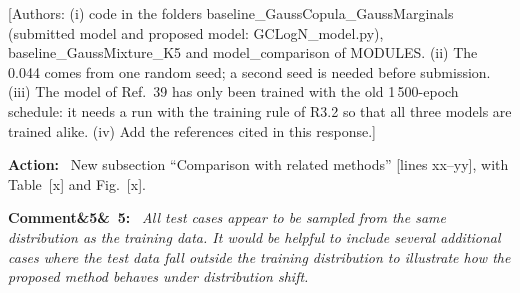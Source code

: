 \documentclass[11pt]{article}
\newenvironment{rcomment}[1]{\par\bigskip\noindent\textbf{Comment\ifx&#1&\else\ #1\fi:}\ \itshape}{\par}
\newenvironment{action}{\par\smallskip\noindent\color{resp}\textbf{Action:}\ }{\par}
\newcommand{\authornote}[1]{\textcolor{note}{\textsf{[Authors: #1]}}}
\newcommand{\tbd}[1]{\textcolor{note}{\textsf{[#1]}}}
\newcommand{\lines}[1]{\tbd{lines #1}}
\begin{document}
\authornote{(i) code in the folders baseline\_GaussCopula\_GaussMarginals (submitted model and proposed model:
GCLogN\_model.py), baseline\_GaussMixture\_K5 and model\_comparison of MODULES. (ii) The 0.044 comes from one random seed; a
second seed is needed before submission. (iii) The model of Ref.~39 has only been trained with the old 1\,500-epoch
schedule: it needs a run with the training rule of R3.2 so that all three models are trained alike. (iv) Add the
references cited in this response.}

\begin{action}
New subsection ``Comparison with related methods'' \lines{xx--yy}, with Table~\tbd{x} and Fig.~\tbd{x}.
\end{action}

\begin{rcomment}{5}
All test cases appear to be sampled from the same distribution as the training data. It would be helpful to include
several additional cases where the test data fall outside the training distribution to illustrate how the proposed
method behaves under distribution shift.
\end{rcomment}
\end{document}
